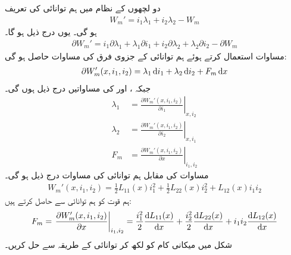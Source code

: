 دو لچھوں کے نظام میں  ہم توانائی کی تعریف
\begin{align*}
W_m'=i_1\lambda_1+i_2\lambda_2-W_m
\end{align*}
ہو گی۔ یوں درج ذیل ہو گا۔
\begin{align*}
\partial W_m'=i_1\partial \lambda_1+\lambda_1\partial i_1+i_2\partial \lambda_2+\lambda_2\partial i_2-\partial W_m
\end{align*}
مساوات  استعمال کرتے ہوئے ہم توانائی کے جزوی فرق کی مساوات حاصل ہو گی:
\begin{align}
\partial W_m'(x,i_1,i_2)=\lambda_1 \dif i_1+\lambda_2 \dif i_2+F_m \dif x
\end{align}
جبکہ ،  اور  کی مساواتیں درج ذیل ہوں گی۔
\begin{align}
\lambda_1&=\left. \frac{\partial W_m'(x,i_1,i_2)}{\partial i_1} \right|_{x,i_2}\\
\lambda_2&=\left. \frac{\partial W_m'(x,i_1,i_2)}{\partial i_2} \right|_{x,i_1}\\
F_m&=\left. \frac{\partial W_m'(x,i_1,i_2)}{\partial x} \right|_{i_1,i_2}
\end{align}
مساوات   کی مقابل ہم توانائی کی مساوات درج ذیل ہو گی۔
\begin{align}
W_m'(x,i_1,i_2)=\frac{1}{2}L_{11}(x) i_1^2+\frac{1}{2} L_{22}(x) i_2^2+L_{12}(x)i_1 i_2
\end{align}
ہم قوت کو ہم توانائی سے  حاصل کرتے ہیں:
\begin{align}
F_m=\left. \frac{\partial W_m'(x,i_1,i_2)}{\partial x} \right|_{i_1,i_2}=\frac{i_1^2}{2} \frac{\dif L_{11}(x)}{\dif x}+\frac{i_2^2}{2}\frac{\dif L_{22}(x)}{\dif x}+i_1 i_2 \frac{\dif L_{12}(x)}{\dif x}
\end{align}
%
شکل   میں میکانی کام کو   لکھ کر توانائی کے طریقہ سے حل کریں۔


